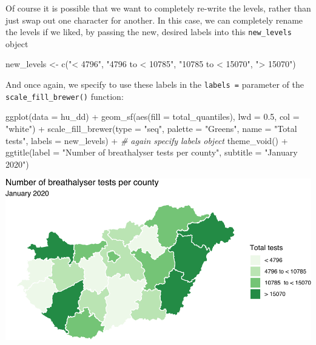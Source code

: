 \documentclass[
]{book}
\newenvironment{Shaded}{\begin{snugshade}}{\end{snugshade}}
\newcommand{\AttributeTok}[1]{\textcolor[rgb]{0.77,0.63,0.00}{#1}}
\newcommand{\CommentTok}[1]{\textcolor[rgb]{0.56,0.35,0.01}{\textit{#1}}}
\newcommand{\FloatTok}[1]{\textcolor[rgb]{0.00,0.00,0.81}{#1}}
\newcommand{\FunctionTok}[1]{\textcolor[rgb]{0.00,0.00,0.00}{#1}}
\newcommand{\NormalTok}[1]{#1}
\newcommand{\OtherTok}[1]{\textcolor[rgb]{0.56,0.35,0.01}{#1}}
\newcommand{\SpecialCharTok}[1]{\textcolor[rgb]{0.00,0.00,0.00}{#1}}
\newcommand{\StringTok}[1]{\textcolor[rgb]{0.31,0.60,0.02}{#1}}
\begin{document}
Of course it is possible that we want to completely re-write the levels, rather than just swap out one character for another. In this case, we can completely rename the levels if we liked, by passing the new, desired labels into this \texttt{new\_levels} object

\begin{Shaded}
\begin{Highlighting}[]
\NormalTok{new\_levels }\OtherTok{\textless{}{-}} \FunctionTok{c}\NormalTok{(}\StringTok{"\textless{} 4796"}\NormalTok{, }\StringTok{"4796 to \textless{} 10785"}\NormalTok{, }\StringTok{"10785  to \textless{} 15070"}\NormalTok{, }\StringTok{"\textgreater{} 15070"}\NormalTok{)}
\end{Highlighting}
\end{Shaded}

And once again, we specify to use these labels in the \texttt{labels\ =} parameter of the \texttt{scale\_fill\_brewer()} function:

\begin{Shaded}
\begin{Highlighting}[]
\FunctionTok{ggplot}\NormalTok{(}\AttributeTok{data =}\NormalTok{ hu\_dd) }\SpecialCharTok{+} 
  \FunctionTok{geom\_sf}\NormalTok{(}\FunctionTok{aes}\NormalTok{(}\AttributeTok{fill =}\NormalTok{ total\_quantiles), }
          \AttributeTok{lwd =} \FloatTok{0.5}\NormalTok{, }\AttributeTok{col =} \StringTok{"white"}\NormalTok{) }\SpecialCharTok{+} 
  \FunctionTok{scale\_fill\_brewer}\NormalTok{(}\AttributeTok{type =} \StringTok{"seq"}\NormalTok{, }\AttributeTok{palette =} \StringTok{"Greens"}\NormalTok{, }
                    \AttributeTok{name =} \StringTok{"Total tests"}\NormalTok{, }
                    \AttributeTok{labels =}\NormalTok{ new\_levels) }\SpecialCharTok{+} \CommentTok{\# again specify labels object}
  \FunctionTok{theme\_void}\NormalTok{() }\SpecialCharTok{+} 
  \FunctionTok{ggtitle}\NormalTok{(}\AttributeTok{label =} \StringTok{"Number of breathalyser tests per county"}\NormalTok{, }
          \AttributeTok{subtitle =} \StringTok{"January 2020"}\NormalTok{)}
\end{Highlighting}
\end{Shaded}

\includegraphics{crime_mapping_files/figure-latex/newnewlabelsplot-1.pdf}
\end{document}
